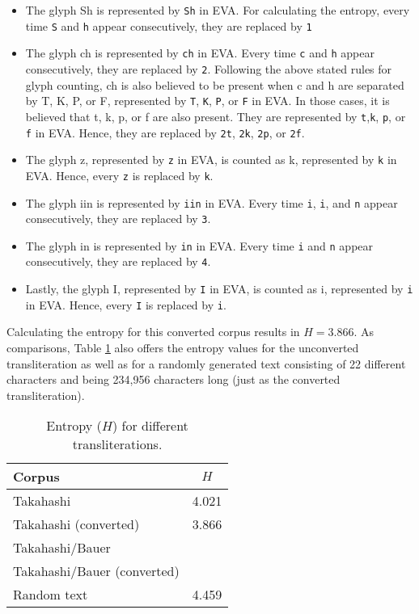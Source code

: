 \documentclass{scrarticle}
\begin{document}
\begin{itemize}
   \item The glyph {\eva Sh} is represented by \texttt{Sh} in EVA. For calculating the entropy, every time \texttt{S} and \texttt{h} appear consecutively, they are replaced by \texttt{1}
   \item The glyph {\eva ch} is represented by \texttt{ch} in EVA. Every time \texttt{c} and \texttt{h} appear consecutively, they are replaced by \texttt{2}. Following the above stated rules for glyph counting, {\eva ch} is also believed to be present when {\eva c} and {\eva h} are separated by {\eva T}, {\eva K}, {\eva P}, or {\eva F}, represented by \texttt{T}, \texttt{K}, \texttt{P}, or \texttt{F} in EVA. In those cases, it is believed that {\eva t}, {\eva k}, {\eva p}, or {\eva f} are also present. They are represented by \texttt{t},\texttt{k}, \texttt{p}, or \texttt{f}  in EVA. Hence, they are replaced by \texttt{2t}, \texttt{2k}, \texttt{2p}, or \texttt{2f}.
   \item The glyph {\eva z}, represented by \texttt{z} in EVA, is counted as {\eva k}, represented by \texttt{k} in EVA. Hence, every \texttt{z} is replaced by \texttt{k}.
   \item The glyph {\eva iin} is represented by \texttt{iin} in EVA. Every time \texttt{i}, \texttt{i}, and \texttt{n} appear consecutively, they are replaced by \texttt{3}.   
   \item The glyph {\eva in} is represented by \texttt{in} in EVA. Every time \texttt{i} and \texttt{n} appear consecutively, they are replaced by \texttt{4}.
   \item Lastly, the glyph {\eva I}, represented by \texttt{I} in EVA, is counted as {\eva i}, represented by \texttt{i} in EVA. Hence, every \texttt{I} is replaced by \texttt{i}.
\end{itemize}

\noindent Calculating the entropy for this converted corpus results in $H=3.866$.
As comparisons, Table \ref{tab:entropy} also offers the entropy values for the unconverted transliteration as well as for a randomly generated text consisting of 22 different characters and being 234,956 characters long (just as the converted transliteration).

\begin{table}[ht]
\center
\begin{tabular}{lr}
   \hline
   Corpus                        & \multicolumn{1}{c}{$H$}   \\
   \hline\hline
   Takahashi                     & 4.021                     \\
   Takahashi (converted)         & 3.866                     \\
   Takahashi/Bauer               &                           \\
   Takahashi/Bauer (converted)   &                           \\
   Random text                   & 4.459                     \\
   \hline
\end{tabular}
\caption{Entropy ($H$) for different transliterations.}
\label{tab:entropy}
\end{table}


\clearpage
\printbibliography
\end{document}
